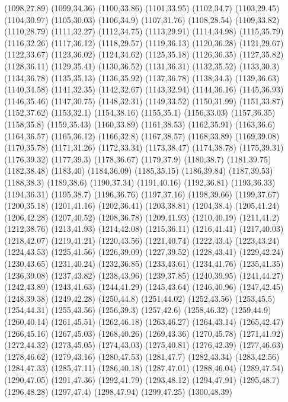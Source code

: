 (1098,27.89)
(1099,34.36)
(1100,33.86)
(1101,33.95)
(1102,34.7)
(1103,29.45)
(1104,30.97)
(1105,30.03)
(1106,34.9)
(1107,31.76)
(1108,28.54)
(1109,33.82)
(1110,28.79)
(1111,32.27)
(1112,34.75)
(1113,29.91)
(1114,34.98)
(1115,35.79)
(1116,32.26)
(1117,36.12)
(1118,29.57)
(1119,36.13)
(1120,36.28)
(1121,29.67)
(1122,33.67)
(1123,36.02)
(1124,34.62)
(1125,35.18)
(1126,36.35)
(1127,35.82)
(1128,36.11)
(1129,35.41)
(1130,36.52)
(1131,36.31)
(1132,35.52)
(1133,30.3)
(1134,36.78)
(1135,35.13)
(1136,35.92)
(1137,36.78)
(1138,34.3)
(1139,36.63)
(1140,34.58)
(1141,32.35)
(1142,32.67)
(1143,32.94)
(1144,36.16)
(1145,36.93)
(1146,35.46)
(1147,30.75)
(1148,32.31)
(1149,33.52)
(1150,31.99)
(1151,33.87)
(1152,37.62)
(1153,32.1)
(1154,38.16)
(1155,35.1)
(1156,33.03)
(1157,36.35)
(1158,35.8)
(1159,35.43)
(1160,33.89)
(1161,38.53)
(1162,35.91)
(1163,36.6)
(1164,36.57)
(1165,36.12)
(1166,32.8)
(1167,38.57)
(1168,33.89)
(1169,39.08)
(1170,35.78)
(1171,31.26)
(1172,33.34)
(1173,38.47)
(1174,38.78)
(1175,39.31)
(1176,39.32)
(1177,39.3)
(1178,36.67)
(1179,37.9)
(1180,38.7)
(1181,39.75)
(1182,38.48)
(1183,40)
(1184,36.09)
(1185,35.15)
(1186,39.84)
(1187,39.53)
(1188,38.3)
(1189,38.6)
(1190,37.34)
(1191,40.16)
(1192,36.81)
(1193,36.33)
(1194,36.31)
(1195,38.7)
(1196,36.76)
(1197,37.16)
(1198,39.66)
(1199,37.67)
(1200,35.18)
(1201,41.16)
(1202,36.41)
(1203,38.81)
(1204,38.4)
(1205,41.24)
(1206,42.28)
(1207,40.52)
(1208,36.78)
(1209,41.93)
(1210,40.19)
(1211,41.2)
(1212,38.76)
(1213,41.93)
(1214,42.08)
(1215,36.11)
(1216,41.41)
(1217,40.03)
(1218,42.07)
(1219,41.21)
(1220,43.56)
(1221,40.74)
(1222,43.4)
(1223,43.24)
(1224,43.53)
(1225,41.56)
(1226,39.09)
(1227,39.52)
(1228,43.41)
(1229,42.24)
(1230,43.65)
(1231,40.24)
(1232,36.85)
(1233,43.61)
(1234,41.76)
(1235,41.35)
(1236,39.08)
(1237,43.82)
(1238,43.96)
(1239,37.85)
(1240,39.95)
(1241,44.27)
(1242,43.89)
(1243,41.63)
(1244,41.29)
(1245,43.64)
(1246,40.96)
(1247,42.45)
(1248,39.38)
(1249,42.28)
(1250,44.8)
(1251,44.02)
(1252,43.56)
(1253,45.5)
(1254,44.31)
(1255,43.56)
(1256,39.3)
(1257,42.6)
(1258,46.32)
(1259,44.9)
(1260,40.14)
(1261,45.51)
(1262,46.18)
(1263,46.27)
(1264,43.14)
(1265,42.47)
(1266,45.16)
(1267,45.03)
(1268,40.26)
(1269,43.36)
(1270,45.78)
(1271,41.92)
(1272,44.32)
(1273,45.05)
(1274,43.03)
(1275,40.81)
(1276,42.39)
(1277,46.63)
(1278,46.62)
(1279,43.16)
(1280,47.53)
(1281,47.7)
(1282,43.34)
(1283,42.56)
(1284,47.33)
(1285,47.11)
(1286,40.18)
(1287,47.01)
(1288,46.04)
(1289,47.54)
(1290,47.05)
(1291,47.36)
(1292,41.79)
(1293,48.12)
(1294,47.91)
(1295,48.7)
(1296,48.28)
(1297,47.4)
(1298,47.94)
(1299,47.25)
(1300,48.39)
